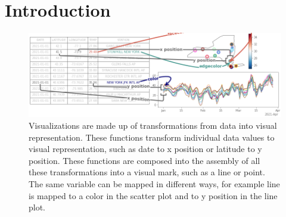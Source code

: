 \documentclass[../main.tex]{subfiles}
\begin{document}
\section{Introduction}
\label{sec:intro}
\begin{figure}[h]
    \includegraphics[width=1\textwidth]{figures/intro/functions.png}
    \caption{Visualizations are made up of transformations from data into visual representation. These functions transform individual data values to visual representation, such as date to x position or latitude to y position. These functions are composed into the assembly of all these transformations into a visual mark, such as a line or point. %
    The same variable can be mapped in different ways, for example line is mapped to a color in the scatter plot and to y position in the line plot.}
    \label{fig:intro_artist}
\end{figure}
\end{document}
